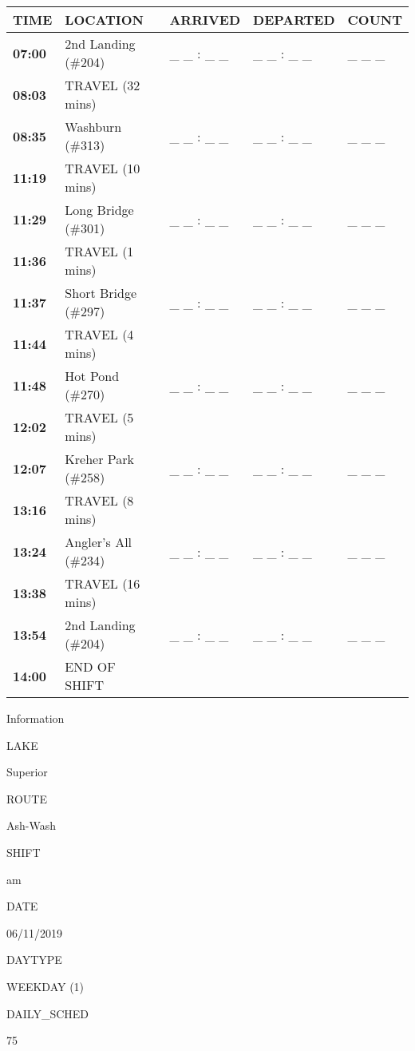 \documentclass[]{article}
\begin{document}
\begin{tabular}{>{\bfseries}lllll}
\toprule
\textbf{TIME} & \textbf{LOCATION} & \textbf{ARRIVED} & \textbf{DEPARTED} & \textbf{COUNT}\\
\midrule
07:00 & 2nd Landing (\#204) & \_ \_ : \_ \_ & \_ \_ : \_ \_ & \_ \_ \_\\
08:03 & TRAVEL (32 mins) &  &  & \\
08:35 & Washburn (\#313) & \_ \_ : \_ \_ & \_ \_ : \_ \_ & \_ \_ \_\\
11:19 & TRAVEL (10 mins) &  &  & \\
11:29 & Long Bridge (\#301) & \_ \_ : \_ \_ & \_ \_ : \_ \_ & \_ \_ \_\\
11:36 & TRAVEL (1 mins) &  &  & \\
11:37 & Short Bridge (\#297) & \_ \_ : \_ \_ & \_ \_ : \_ \_ & \_ \_ \_\\
11:44 & TRAVEL (4 mins) &  &  & \\
11:48 & Hot Pond (\#270) & \_ \_ : \_ \_ & \_ \_ : \_ \_ & \_ \_ \_\\
12:02 & TRAVEL (5 mins) &  &  & \\
12:07 & Kreher Park (\#258) & \_ \_ : \_ \_ & \_ \_ : \_ \_ & \_ \_ \_\\
13:16 & TRAVEL (8 mins) &  &  & \\
13:24 & Angler's All (\#234) & \_ \_ : \_ \_ & \_ \_ : \_ \_ & \_ \_ \_\\
13:38 & TRAVEL (16 mins) &  &  & \\
13:54 & 2nd Landing (\#204) & \_ \_ : \_ \_ & \_ \_ : \_ \_ & \_ \_ \_\\
14:00 & END OF SHIFT &  &  & \\
\bottomrule
\end{tabular}\newpage

Information

LAKE

Superior

ROUTE

Ash-Wash

SHIFT

am

DATE

06/11/2019

DAYTYPE

WEEKDAY (1)

DAILY\_SCHED

75

\vspace{24pt}
\end{document}
